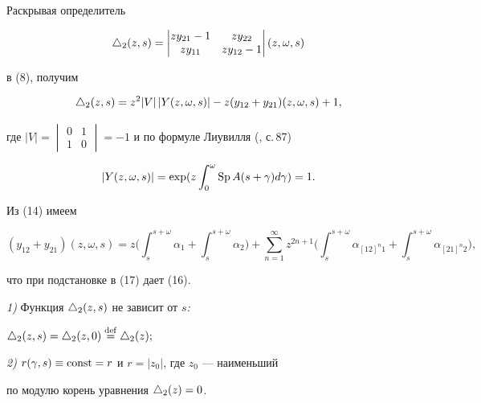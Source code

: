 \begin{pf} Раскрывая определитель


$$


\tri_2(z,s)=


\begin{vmatrix}


zy_{21}-1 & zy_{22}\\


zy_{11} & zy_{12}-1


\end{vmatrix}


(z,\omega,s)


$$


в (8), получим


\begin{equation}


\tri_2(z,s)=z^2|V|\,|Y(z,\omega,s)|-z(y_{12}+y_{21})(z,\omega,s)+1,


\end{equation}


где $|V|=


\begin{vmatrix}


0 & 1\\


1 & 0


\end{vmatrix}


=-1$ и по формуле Лиувилля (\cite{Bib}, с.\,87)


$$


|Y(z,\omega,s)|=\exp (z\int_0^\omega \spp A(s+\g)d\g)=1.


$$


Из (14) имеем


$$


(y_{12}+y_{21})(z,\omega,s)=z\biggl(\int_s^{s+\omega}\alpha_1+


\int_s^{s+\omega}\alpha_2\biggr)+


\sum_{n=1}^\infty z^{2n+1}\biggl(\int_s^{s+\omega}\alpha_{[12]^n1}+


\int_s^{s+\omega}\alpha_{[21]^n2}\biggr),


$$


что при подстановке в (17) дает (16).


\end{pf}





\begin{lem} {\em 1)} Функция $\triangle_2(z,s)$ не зависит от $s${\em :}


$\triangle_2(z,s)=\triangle_2(z,0)\overset{\mathrm{def}}{=}{}\triangle_2(z);$





{\em 2)} $r(\gamma,s)\equiv \operatorname{const}=r$ и $r=|z_0|$, где $z_0$ --- наименьший


по модулю корень уравнения $\triangle_2(z)=0$.


\end{lem}





